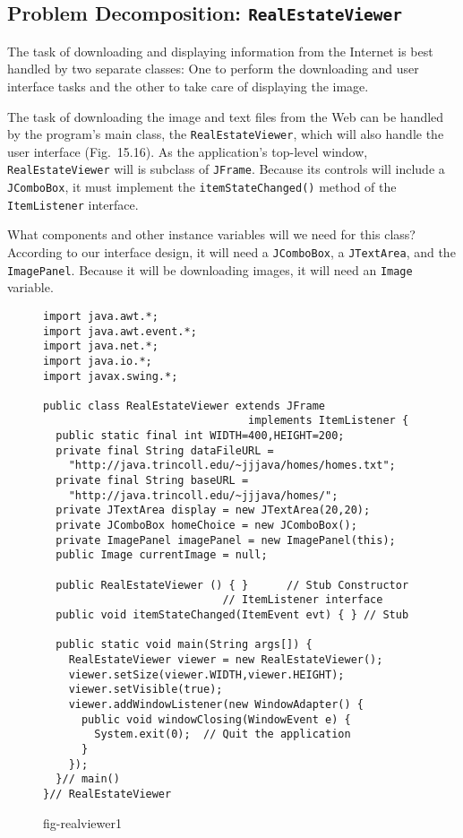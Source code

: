 \subsection*{Problem Decomposition: {\tt RealEstateViewer}}
\noindent The task of downloading and displaying information from the Internet
is best handled by two separate classes: One to perform the
downloading and user interface tasks and the other to take care of
displaying the image.

The task of downloading the image and text files from the Web can be
handled by the program's main class, the {\tt RealEstateViewer}, which
will also handle the user interface (Fig.~15.16).  As the
application's top-level window, {\tt RealEstateViewer} will is
subclass of {\tt JFrame}.  Because its controls will include a {\tt
JComboBox}, it must implement the {\tt itemStateChanged()} method of
the {\tt ItemListener} interface.

What components and other instance variables will we need for this
class? According to our interface design, it will need a {\tt JComboBox},
a {\tt JTextArea}, and the {\tt ImagePanel}. Because it will be
downloading images, it will need an {\tt Image} variable.


\begin{figure}[tb]
\jjjprogstart
\begin{jjjlisting}
\begin{lstlisting}
import java.awt.*;
import java.awt.event.*;
import java.net.*;
import java.io.*;
import javax.swing.*;

public class RealEstateViewer extends JFrame 
                                implements ItemListener {
  public static final int WIDTH=400,HEIGHT=200;
  private final String dataFileURL =
    "http://java.trincoll.edu/~jjjava/homes/homes.txt";
  private final String baseURL = 
    "http://java.trincoll.edu/~jjjava/homes/";
  private JTextArea display = new JTextArea(20,20);
  private JComboBox homeChoice = new JComboBox();
  private ImagePanel imagePanel = new ImagePanel(this);
  public Image currentImage = null;

  public RealEstateViewer () { }      // Stub Constructor
                            // ItemListener interface
  public void itemStateChanged(ItemEvent evt) { } // Stub

  public static void main(String args[]) {
    RealEstateViewer viewer = new RealEstateViewer();
    viewer.setSize(viewer.WIDTH,viewer.HEIGHT);
    viewer.setVisible(true);
    viewer.addWindowListener(new WindowAdapter() {     
      public void windowClosing(WindowEvent e) {
        System.exit(0);  // Quit the application
      }
    });
  }// main()
}// RealEstateViewer
\end{lstlisting}
\end{jjjlisting}
{fig-realviewer1}
\end{figure}


